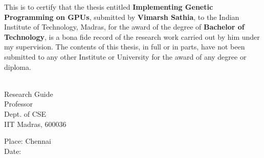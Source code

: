 \certificate

\vspace*{0.5in}

\noindent This is to certify that the thesis entitled {\bf Implementing Genetic Programming on GPUs}, 
submitted by {\bf Vimarsh Sathia}, to the Indian Institute of Technology, 
Madras, for the award of the degree of {\bf Bachelor of Technology}, 
is a bona fide record of the research work carried out by him under my
supervision. The contents of this thesis, in full or in parts, have not been
submitted to any other Institute or University for the award of any degree or
diploma.

\vspace*{1.4in}
\hspace*{-0.25in}
\begin{singlespacing}
	\hspace*{-0.25in}
	\parbox{2.5in}{
		 \\
		\noindent Research Guide \\ 
		\noindent Professor \\
		\noindent Dept. of CSE\\
		\noindent IIT Madras, 600036 \\
	} 
	\hspace*{1.0in} 
\end{singlespacing}
\vspace*{0.25in}
\noindent Place: Chennai\\
Date: 